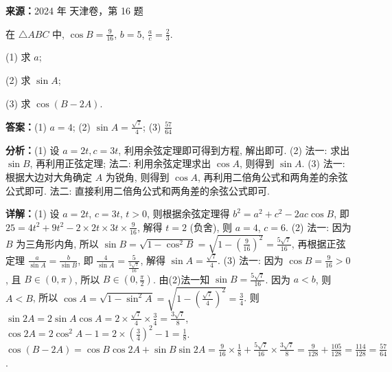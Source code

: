 \begin{question}[points=14]
\textbf{来源：}2024 年 天津卷，第 16 题\par
在 $\triangle ABC$ 中, $\cos B = \frac{9}{16}$, $b=5$, $\frac{a}{c}=\frac{2}{3}$.

(1) 求 $a$;

(2) 求 $\sin A$;

(3) 求 $\cos(B-2A)$.
\begin{solution}
\textbf{答案：}(1) $a=4$; (2) $\sin A = \frac{\sqrt{7}}{4}$; (3) $\frac{57}{64}$

\textbf{分析：}(1) 设 $a=2t,c=3t$, 利用余弦定理即可得到方程, 解出即可. (2) 法一: 求出 $\sin B$, 再利用正弦定理; 法二: 利用余弦定理求出 $\cos A$, 则得到 $\sin A$. (3) 法一: 根据大边对大角确定 $A$ 为锐角, 则得到 $\cos A$, 再利用二倍角公式和两角差的余弦公式即可. 法二: 直接利用二倍角公式和两角差的余弦公式即可.

\textbf{详解：}(1) 设 $a=2t$, $c=3t$, $t>0$, 则根据余弦定理得 $b^2=a^2+c^2-2ac\cos B$, 即 $25=4t^2+9t^2-2\times2t\times3t\times\frac{9}{16}$, 解得 $t=2$ (负舍), 则 $a=4$, $c=6$.
(2) 法一: 因为 $B$ 为三角形内角, 所以 $\sin B = \sqrt{1-\cos^2 B} = \sqrt{1-\left(\frac{9}{16}\right)^2} = \frac{5\sqrt{7}}{16}$, 再根据正弦定理 $\frac{a}{\sin A}=\frac{b}{\sin B}$, 即 $\frac{4}{\sin A}=\frac{5}{\frac{5\sqrt{7}}{16}}$, 解得 $\sin A = \frac{\sqrt{7}}{4}$.
(3) 法一: 因为 $\cos B=\frac{9}{16}>0$, 且 $B\in(0,\pi)$, 所以 $B\in(0,\frac{\pi}{2})$. 由(2)法一知 $\sin B=\frac{5\sqrt{7}}{16}$. 因为 $a<b$, 则 $A<B$, 所以 $\cos A=\sqrt{1-\sin^2 A}=\sqrt{1-\left(\frac{\sqrt{7}}{4}\right)^2}=\frac{3}{4}$. 则 $\sin2A=2\sin A\cos A=2\times\frac{\sqrt{7}}{4}\times\frac{3}{4}=\frac{3\sqrt{7}}{8}$, $\cos2A=2\cos^2 A-1=2\times\left(\frac{3}{4}\right)^2-1=\frac{1}{8}$. $\cos(B-2A)=\cos B\cos2A+\sin B\sin2A=\frac{9}{16}\times\frac{1}{8}+\frac{5\sqrt{7}}{16}\times\frac{3\sqrt{7}}{8}=\frac{9}{128}+\frac{105}{128}=\frac{114}{128}=\frac{57}{64}$.
\end{solution}
\end{question}

